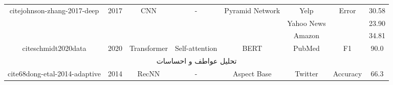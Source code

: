 \documentclass[12pt, a4paper, oneside]{report}
\begin{document}
\begin{tabular}{|c|c|c|c|c|c|cc|}
    \multirow{3}{*}{cite{johnson-zhang-2017-deep}}      & \multirow{3}{*}{2017} & \multirow{3}{*}{CNN}              & \multirow{3}{*}{-}                      & \multirow{3}{*}{Pyramid Network}                                                                       & Yelp                                  & \multicolumn{1}{c|}{\multirow{3}{*}{Error}}                                                                                        & 30.58  \\ \cline{6-6} \cline{8-8} 
                                                                          &                       &                                   &                                         &                                                                                                        & Yahoo News                            & \multicolumn{1}{c|}{}                                                                                                              & 23.90  \\ \cline{6-6} \cline{8-8} 
                                                                          &                       &                                   &                                         &                                                                                                        & Amazon                                & \multicolumn{1}{c|}{}                                                                                                              & 34.81  \\ \hline
    cite{schmidt2020data}                               & 2020                  & Transformer                       & Self-attention                          & BERT                                                                                                   & PubMed                                & \multicolumn{1}{c|}{F1}                                                                                                            & 90.0   \\ \hline
    \multicolumn{8}{|c|}{تحلیل عواطف و احساسات}                                                                                                                                                                                                                                                                                                                                                                                                                                \\ \hline
    \multirow{2}{*}{cite{68dong-etal-2014-adaptive}}    & \multirow{2}{*}{2014} & \multirow{2}{*}{RecNN}            & \multirow{2}{*}{-}                      & \multirow{2}{*}{Aspect Base}                                                                           & \multirow{2}{*}{Twitter}              & \multicolumn{1}{c|}{Accuracy}                                                                                                      & 66.3   \\ \cline{7-8} 

\end{tabular}
\end{document}
